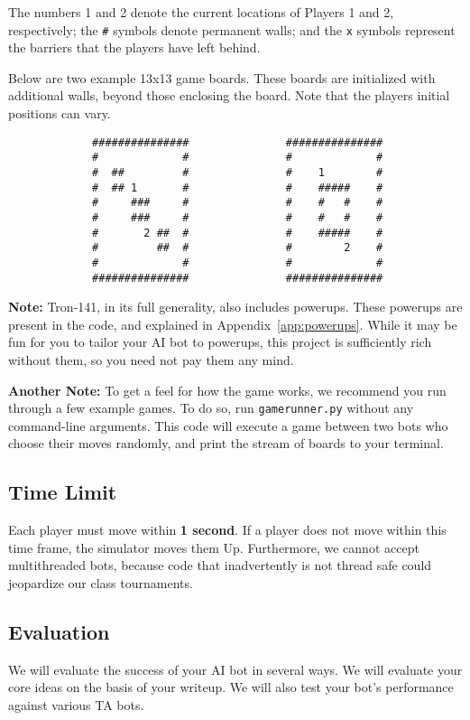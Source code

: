 \documentclass{article}
\begin{document}
\noindent
The numbers 1 and 2 denote the current locations of Players 1 and 2,
respectively; the \verb|#| symbols denote permanent walls; and the
\verb|x| symbols represent the barriers that the players have left
behind.

Below are two example 13x13 game boards.  These boards are initialized
with additional walls, beyond those enclosing the board.
Note that the players initial positions can vary.

\smallskip
\begin{verbatim}
             ###############               ###############
             #             #               #             #
             #  ##         #               #    1        #
             #  ## 1       #               #    #####    #
             #     ###     #               #    #   #    #
             #     ###     #               #    #   #    #
             #       2 ##  #               #    #####    #
             #         ##  #               #        2    #
             #             #               #             #
             ###############               ###############
\end{verbatim}
\smallskip

\textbf{Note:} Tron-141, in its full generality, also includes
powerups.  These powerups are present in the code, and explained in
Appendix~\ref{app:powerups}.  While it may be fun for you to tailor
your AI bot to powerups, this project is sufficiently rich without
them, so you need not pay them any mind.

\textbf{Another Note:} To get a feel for how the game works, we
recommend you run through a few example games.  To do so, run
\verb|gamerunner.py| without any command-line arguments.  This code
will execute a game between two bots who choose their moves
randomly, and print the stream of boards to your terminal.


\subsection{Time Limit}
Each player must move within \textbf{1 second}.
If a player does not move within this time frame,
the simulator moves them Up.
%
Furthermore, we cannot accept multithreaded bots, because code that
inadvertently is not thread safe could jeopardize our class
tournaments.


\subsection{Evaluation}
We will evaluate the success of your AI bot in several ways.  We will
evaluate your core ideas on the basis of your writeup.  We will also
test your bot's performance against various TA bots. 
\end{document}
